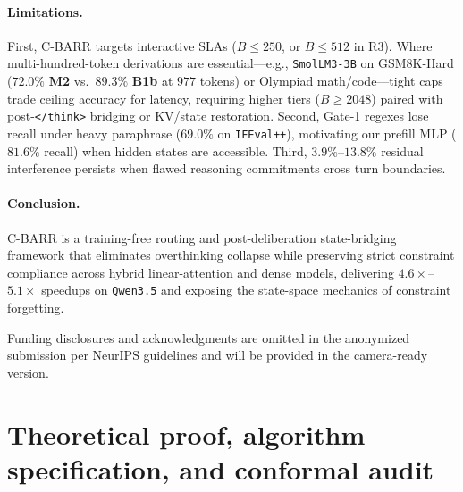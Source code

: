 \documentclass{article}
\begin{document}
\paragraph{Limitations.}
First, C-BARR targets interactive SLAs ($B \le 250$, or $B \le 512$ in R3). Where multi-hundred-token derivations are essential---e.g., \texttt{SmolLM3-3B} on GSM8K-Hard ($72.0\%$ \textbf{M2} vs.\ $89.3\%$ \textbf{B1b} at $977$ tokens) or Olympiad math/code---tight caps trade ceiling accuracy for latency, requiring higher tiers ($B \ge 2048$) paired with post-\texttt{</think>} bridging or KV/state restoration. Second, Gate-1 regexes lose recall under heavy paraphrase ($69.0\%$ on \texttt{IFEval++}), motivating our prefill MLP ($81.6\%$ recall) when hidden states are accessible. Third, $3.9\%$--$13.8\%$ residual interference persists when flawed reasoning commitments cross turn boundaries.

\paragraph{Conclusion.}
C-BARR is a training-free routing and post-deliberation state-bridging framework that eliminates overthinking collapse while preserving strict constraint compliance across hybrid linear-attention and dense models, delivering $4.6\times$--$5.1\times$ speedups on \texttt{Qwen3.5} and exposing the state-space mechanics of constraint forgetting.

\begin{ack}
Funding disclosures and acknowledgments are omitted in the anonymized submission per NeurIPS guidelines and will be provided in the camera-ready version.
\end{ack}

{\small


}

\clearpage
\appendix

\section{Theoretical proof, algorithm specification, and conformal audit}
\label{app:proof}
\end{document}
